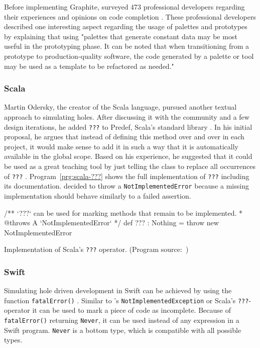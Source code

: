 Before implementing Graphite, \citeauthor{omar_active_2012} surveyed 473 professional developers regarding their experiences and opinions on code completion \cite{omar_active_2012}.
These professional developers described one interesting aspect regarding the usage of palettes and prototypes by explaining that using "palettes that generate constant data may be most useful in the prototyping phase. It can be noted that when transitioning from a prototype to production-quality software, the code generated by a palette or tool may be used as a template to be refactored as needed." \cite{omar_active_2012}

\subsubsection{Scala}
Martin Odersky, the creator of the Scala language, pursued another textual approach to simulating holes.
After discussing it with the community and a few design iterations, he added \texttt{???} to Predef, Scala's standard library \cite{odersky_adding_2011}.
In his initial proposal, he argues that instead of defining this method over and over in each project, it would make sense to add it in such a way that it is automatically available in the global scope.
Based on his experience, he suggested that it could be used as a great teaching tool by just telling the class to replace all occurrences of \texttt{???} \cite{odersky_adding_2011}.
Program~\ref{prg:scala-???} shows the full implementation of \texttt{???} including its documentation.
\citeauthor{odersky_adding_2011} decided to throw a \texttt{NotImplementedError} because a missing implementation should behave similarly to a failed assertion.
%
\begin{program}[ht]
\begin{GenericCode}
/** `???` can be used for marking methods that remain to be implemented.
* @throws A `NotImplementedError`
*/
def ??? : Nothing = throw new NotImplementedError
\end{GenericCode}
\caption{Implementation of Scala's \texttt{???} operator. (Program source:~\cite{odersky_adding_2011})}
\label{prg:scala-???}
\end{program}

\subsubsection{Swift}
Simulating hole driven development in Swift can be achieved by using the function \texttt{fatalError()} \cite{martinez_hole_2018}.
Similar to \CS's \texttt{NotImplementedException} or Scala's \texttt{???}-operator it can be used to mark a piece of code as incomplete.
Because of \texttt{fatalError()} returning \texttt{Never}, it can be used instead of any expression in a Swift program.
\texttt{Never} is a bottom type, which is compatible with all possible types.

